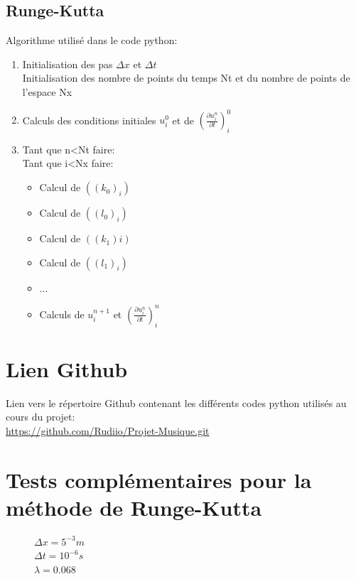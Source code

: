 \subsection{Runge-Kutta}
Algorithme utilisé dans le code python:
\begin{enumerate}
    \item Initialisation des pas $\Delta x$ et $\Delta t$\\
    Initialisation des nombre de points du temps Nt et du nombre de points de l'espace Nx
    
    \item Calculs des conditions initiales $u^0_{i}$ et de $(\frac{\partial u^n_{i}}{\partial t})^0_{i}$
    
    \item Tant que n<Nt faire:\\
     Tant que i<Nx faire:
        \begin{itemize}
            \item Calcul de $((k_0)_{i})$
            \item Calcul de $((l_0)_{i})$
            \item Calcul de $((k_1){i})$
            \item Calcul de $((l_1)_{i})$
            \item ...
            \item Calculs de $u^{n+1}_{i}$ et $(\frac{\partial u^n_{i}}{\partial t})^n_{i}$
        \end{itemize}
    
\end{enumerate}

\section{Lien Github}
Lien vers le répertoire Github contenant les différents codes python utilisés au cours du projet:\\
\url{https://github.com/Rudiio/Projet-Musique.git}

\section{Tests complémentaires pour la méthode de Runge-Kutta}
\begin{figure}[H]
\begin{minipage}[b]{.46\linewidth}
\centering{}
\caption{
        $\Delta x= 5^{-2}m $\\
        $\Delta t= 10^{-7}s$\\
        $\lambda = 6.8.10^{-4}$
    \label{fig1}
    }
\end{minipage} \hfill
\begin{minipage}[b]{.46\linewidth}
\centering{}
\caption{$\Delta x= 5^{-3}m $\\ 
        $\Delta t= 10^{-6}s$\\
        $\lambda = 0.068$
        \label{fig2}}
\end{minipage}
\end{figure}

